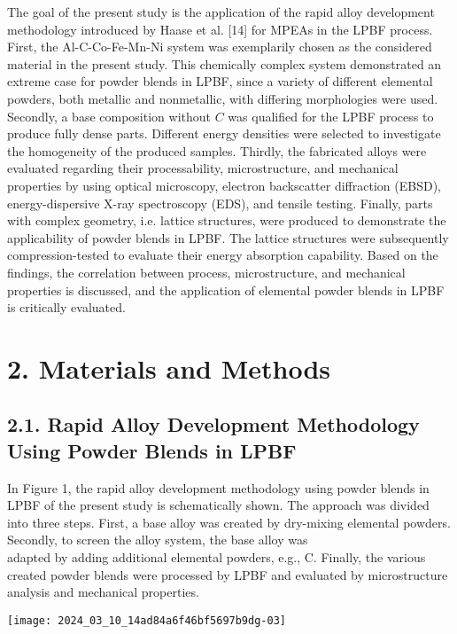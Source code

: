 \documentclass[10pt]{article}
\begin{document}
The goal of the present study is the application of the rapid alloy development methodology introduced by Haase et al. [14] for MPEAs in the LPBF process. First, the Al-C-Co-Fe-Mn-Ni system was exemplarily chosen as the considered material in the present study. This chemically complex system demonstrated an extreme case for powder blends in LPBF, since a variety of different elemental powders, both metallic and nonmetallic, with differing morphologies were used. Secondly, a base composition without $C$ was qualified for the LPBF process to produce fully dense parts. Different energy densities were selected to investigate the homogeneity of the produced samples. Thirdly, the fabricated alloys were evaluated regarding their processability, microstructure, and mechanical properties by using optical microscopy, electron backscatter diffraction (EBSD), energy-dispersive X-ray spectroscopy (EDS), and tensile testing. Finally, parts with complex geometry, i.e. lattice structures, were produced to demonstrate the applicability of powder blends in LPBF. The lattice structures were subsequently compression-tested to evaluate their energy absorption capability. Based on the findings, the correlation between process, microstructure, and mechanical properties is discussed, and the application of elemental powder blends in LPBF is critically evaluated.

\section*{2. Materials and Methods}
\subsection*{2.1. Rapid Alloy Development Methodology Using Powder Blends in LPBF}
In Figure 1, the rapid alloy development methodology using powder blends in LPBF of the present study is schematically shown. The approach was divided into three steps. First, a base alloy was created by dry-mixing elemental powders. Secondly, to screen the alloy system, the base alloy was\\
adapted by adding additional elemental powders, e.g., C. Finally, the various created powder blends were processed by LPBF and evaluated by microstructure analysis and mechanical properties.

\begin{center}
\texttt{[image: 2024\_03\_10\_14ad84a6f46bf5697b9dg-03]}
\end{center}
\end{document}
